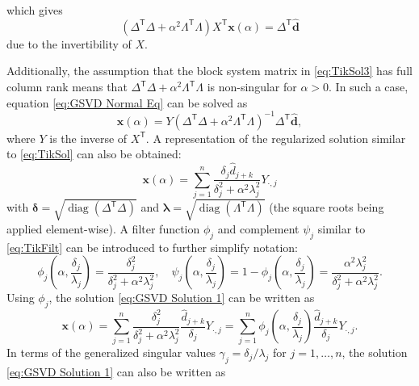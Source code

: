 \documentclass[12pt]{article}
\newcommand{\dVec}{\mathbf{d}}	%
\newcommand{\xVec}{\mathbf{x}}	%
\newcommand{\trans}[1]{{#1}^\mathsf{T}}	%
\newcommand{\inv}[1]{{#1}^{-1}}	%
\DeclareMathOperator{\diag}{diag}	%
\newcommand{\regparam}{\alpha}  %
\newcommand{\filt}{\phi}
\newcommand{\mfilt}{\psi}
\newcommand{\svd}[1]{\widehat{#1}}	%
\begin{document}
which gives 
\begin{equation}
    \label{eq:GSVD Normal Eq}
    (\trans{\Delta}\Delta + \regparam^2 \trans{\Lambda}\Lambda)\trans{X}\xVec(\regparam) = \trans{\Delta}\svd{\dVec}
\end{equation}
due to the invertibility of $X$. \par
Additionally, the assumption that the block system matrix in \eqref{eq:TikSol3} has full column rank means that $\trans{\Delta}\Delta + \regparam^2 \trans{\Lambda}\Lambda$ is non-singular for $\regparam > 0$. In such a case, equation \eqref{eq:GSVD Normal Eq} can be solved as
\begin{equation}
    \label{eq:GSVD Normal Eq Sol}
    \xVec(\regparam) = Y\inv{\left(\trans{\Delta}\Delta + \regparam^2 \trans{\Lambda}\Lambda\right)}\trans{\Delta}\svd{\dVec},
\end{equation}
where $Y$ is the inverse of $\trans{X}$. A representation of the regularized solution similar to \eqref{eq:TikSol} can also be obtained:
\begin{equation}
\label{eq:GSVD Solution 1}
\xVec(\regparam) = \sum_{j = 1}^{n} \frac{\delta_j \svd{d}_{j+k}}{\delta^2_j + \regparam^2 \lambda^2_j}Y_{\cdot,j}
\end{equation}
with $\bm{\delta} = \sqrt{\diag(\trans{\Delta}\Delta)}$ and $\bm{\lambda} = \sqrt{\diag(\trans{\Lambda}\Lambda)}$ (the square roots being applied element-wise).  A filter function $\filt_j$ and complement $\mfilt_j$ similar to \eqref{eq:TikFilt} can be introduced to further simplify notation:
\begin{equation}
\label{eq:Filter functions}
\filt_j\left(\regparam,\frac{\delta_j}{\lambda_j}\right) = \frac{\delta^2_j}{\delta^2_j + \regparam^2 \lambda^2_j}, \quad \mfilt_j\left(\regparam,\frac{\delta_j}{\lambda_j}\right) = 1 - \filt_j\left(\regparam,\frac{\delta_j}{\lambda_j}\right) = \frac{\regparam^2 \lambda^2_j}{\delta^2_j + \regparam^2 \lambda^2_j}.
\end{equation}
Using $\filt_j$, the solution \eqref{eq:GSVD Solution 1} can be written as
\begin{equation}
\label{eq:GSVD Solution 2}
\xVec(\regparam) = \sum_{j = 1}^{n} \frac{\delta^2_j}{\delta^2_j + \regparam^2 \lambda^2_j} \frac{\svd{d}_{j+k}}{\delta_j} Y_{\cdot,j} = \sum_{j = 1}^{n} \filt_j\left(\regparam,\frac{\delta_j}{\lambda_j}\right) \frac{\svd{d}_{j+k}}{\delta_j} Y_{\cdot,j}.
\end{equation} 
In terms of the generalized singular values $\gamma_j = \delta_j/\lambda_j$ for $j = 1,\ldots,n$, the solution \eqref{eq:GSVD Solution 1} can also be written as
\end{document}
